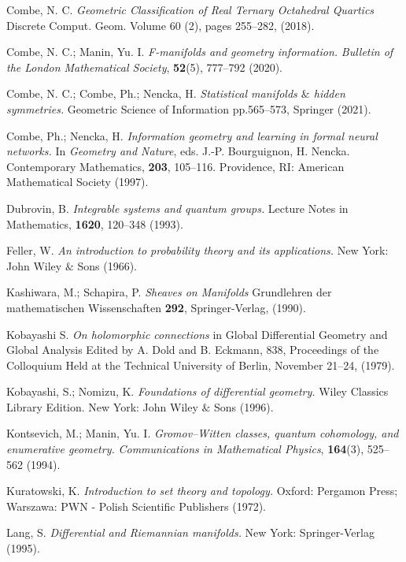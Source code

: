 \begin{thebibliography}{9}
 Combe, N. C. \textit{Geometric Classification of Real Ternary Octahedral Quartics} Discrete Comput. Geom. Volume 60 (2), pages 255–282, (2018).

 Combe, N. C.; Manin, Yu. I. \textit{F-manifolds and geometry information.} \textit{Bulletin of the London Mathematical Society}, \textbf{52}(5), 777--792 (2020).

 Combe, N. C.; Combe, Ph.; Nencka, H. \textit{Statistical manifolds $\&$ hidden symmetries.} Geometric Science of Information pp.565–573, Springer (2021).

 Combe, Ph.; Nencka, H. \textit{Information geometry and learning in formal neural networks.} In \textit{Geometry and Nature}, eds. J.-P. Bourguignon, H. Nencka. Contemporary Mathematics, \textbf{203}, 105--116. Providence, RI: American Mathematical Society (1997).

 Dubrovin, B. \textit{Integrable systems and quantum groups.} Lecture Notes in Mathematics, \textbf{1620}, 120--348 (1993).

 Feller, W. \textit{An introduction to probability theory and its applications.} New York: John Wiley $\&$ Sons (1966).

  Kashiwara, M.; Schapira, P. \textit{ Sheaves on Manifolds}
Grundlehren der mathematischen Wissenschaften \textbf{292},  Springer-Verlag, (1990).

 Kobayashi S. \textit{ On holomorphic connections} in Global Differential Geometry and Global Analysis Edited by A. Dold and B. Eckmann, 838, Proceedings of the Colloquium Held at the Technical University of Berlin, November 21--24, (1979).

 Kobayashi, S.; Nomizu, K. \textit{Foundations of differential geometry.} Wiley Classics Library Edition. New York: John Wiley $\&$ Sons (1996).

 Kontsevich, M.; Manin, Yu. I. \textit{Gromov--Witten classes, quantum cohomology, and enumerative geometry.} \textit{Communications in Mathematical Physics}, \textbf{164}(3), 525--562 (1994).

 Kuratowski, K. \textit{Introduction to set theory and topology.} Oxford: Pergamon Press; Warszawa: PWN - Polish Scientific Publishers (1972).

 Lang, S. \textit{Differential and Riemannian manifolds.} New York: Springer-Verlag (1995).


\end{thebibliography}
